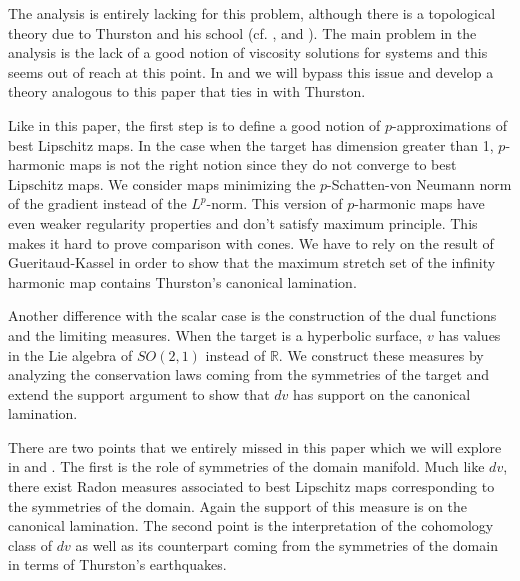 \documentclass{ip-journal}
\theoremstyle{definition}
\numberwithin{equation}{section}
\newcommand{\R}{\mathbb R}
\begin{document}
 The analysis is entirely lacking for this problem, although there is a  topological theory due to Thurston and his school (cf. \cite{thurston}, \cite{papa} and \cite{kassel}). 
  The main problem in the analysis is the lack of a good notion  of viscosity solutions for systems and this seems out of reach at this point. In \cite{daskal-uhlen2} and \cite{daskal-uhlen3} we will  bypass this issue and develop a theory analogous to this paper that ties in with Thurston.
  
  Like in this paper, the first step is to define a good notion of $p$-approximations of best Lipschitz maps.  In the case when the target has dimension greater than 1, $p$-harmonic maps is not the right notion since they do not converge to best Lipschitz maps.  We consider  maps minimizing the $p$-Schatten-von Neumann norm of the gradient instead of the $L^p$-norm.  This version of $p$-harmonic maps have even weaker regularity properties and don't satisfy maximum principle. This makes it hard to prove  comparison with cones. We have to
  rely on the result of Gueritaud-Kassel \cite{kassel} in order to show that the maximum stretch set of the infinity harmonic map contains  Thurston's canonical lamination. 
  
  Another difference  with the scalar case is the construction of the dual functions and the limiting measures. When the target is a hyperbolic surface,  $v$ has values in the Lie algebra of $SO(2,1)$ instead of $\R$. We construct these measures by analyzing the conservation laws coming from the symmetries of the target and extend the support argument  to show that $dv$ has support on the canonical lamination.
  
  There are two points that we entirely missed in this paper which we will explore in \cite{daskal-uhlen2} and \cite{daskal-uhlen3}. The first is the role of symmetries of the domain manifold. Much like $dv$, there exist  Radon measures associated to  best Lipschitz maps corresponding to the symmetries of the domain. Again the support of this measure is on the canonical lamination. The second point is the interpretation of the cohomology class of $dv$ as well as its counterpart coming from the symmetries of the domain in terms of Thurston's earthquakes. 
\end{document}
